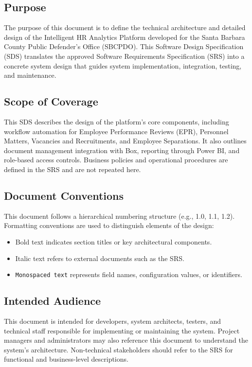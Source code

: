 \documentclass[12pt]{article}
\def\textbf#1{#1}%
\def\textit#1{#1}%
\begin{document}
\subsection{Purpose}

The purpose of this document is to define the technical architecture and detailed design of the Intelligent HR Analytics Platform developed for the Santa Barbara County Public Defender’s Office (SBCPDO). This Software Design Specification (SDS) translates the approved Software Requirements Specification (SRS) into a concrete system design that guides system implementation, integration, testing, and maintenance.

\subsection{Scope of Coverage}

This SDS describes the design of the platform’s core components, including workflow automation for Employee Performance Reviews (EPR), Personnel Matters, Vacancies and Recruitments, and Employee Separations. It also outlines document management integration with Box, reporting through Power BI, and role-based access controls. Business policies and operational procedures are defined in the SRS and are not repeated here.

\subsection{Document Conventions}

This document follows a hierarchical numbering structure (e.g., 1.0, 1.1, 1.2). Formatting conventions are used to distinguish elements of the design:
\begin{itemize}
    \item \textbf{Bold text} indicates section titles or key architectural components.
    \item \textit{Italic text} refers to external documents such as the SRS.
    \item \texttt{Monospaced text} represents field names, configuration values, or identifiers.
\end{itemize}

\subsection{Intended Audience}

This document is intended for developers, system architects, testers, and technical staff responsible for implementing or maintaining the system. Project managers and administrators may also reference this document to understand the system’s architecture. Non-technical stakeholders should refer to the SRS for functional and business-level descriptions.
\end{document}
